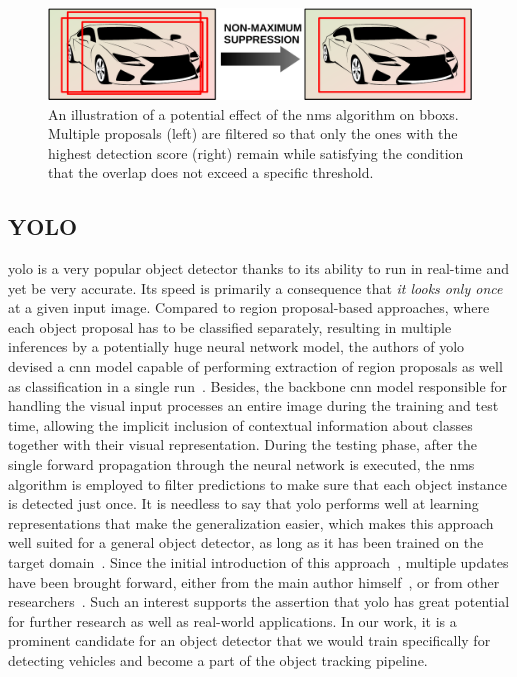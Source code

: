 \begin{figure}[t]
    \centerline{\includegraphics[width=0.7\linewidth]{figures/theoretical_foundations/non_maximum_suppression.pdf}}
    \caption[\Gls{nms} visualization]{An illustration of a potential effect of the \gls{nms} algorithm on \glspl{bbox}. Multiple proposals (left) are filtered so that only the ones with the highest detection score (right) remain while satisfying the condition that the overlap does not exceed a specific threshold.}
    \label{fig:NonMaximumSuppression}
\end{figure}

\subsection{YOLO}
\label{ssec:YouLookOnlyOnce}

\Gls{yolo} is a very popular object detector thanks to its ability to run in real-time and yet be very accurate. Its speed is primarily a consequence that \emph{it looks only once} at a given input image. Compared to region proposal-based approaches, where each object proposal has to be classified separately, resulting in multiple inferences by a potentially huge neural network model, the authors of \gls{yolo} devised a \gls{cnn} model capable of performing extraction of region proposals as well as classification in a single run~\cite{Redmon2016}. Besides, the backbone \gls{cnn} model responsible for handling the visual input processes an entire image during the training and test time, allowing the implicit inclusion of contextual information about classes together with their visual representation. During the testing phase, after the single forward propagation through the neural network is executed, the \gls{nms} algorithm is employed to filter predictions to make sure that each object instance is detected just once. It is needless to say that \Gls{yolo} performs well at learning representations that make the generalization easier, which makes this approach well suited for a general object detector, as long as it has been trained on the target domain~\cite{Redmon2016}. Since the initial introduction of this approach~\cite{Redmon2016}, multiple updates have been brought forward, either from the main author himself~\cite{Redmon2017, Redmon2018}, or from other researchers~\cite{Wang, Wong2019}. Such an interest supports the assertion that \gls{yolo} has great potential for further research as well as real-world applications. In our work, it is a prominent candidate for an object detector that we would train specifically for detecting vehicles and become a part of the object tracking pipeline.

